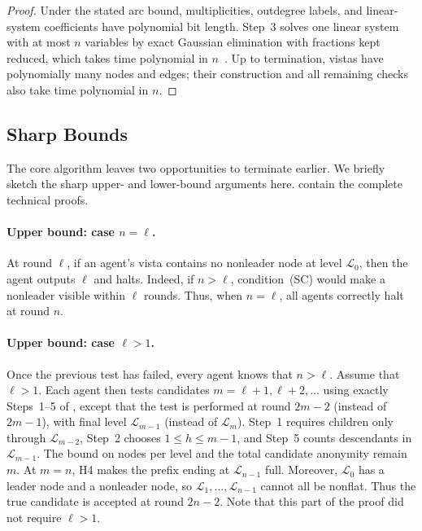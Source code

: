 \documentclass[11pt]{article}
\begin{document}
\begin{proof}
Under the stated arc bound, multiplicities, outdegree labels, and
linear-system coefficients have polynomial bit length.
Step~3 solves one linear system with at most \(n\) variables by
exact Gaussian elimination with fractions kept reduced, which takes
time polynomial in \(n\)~\cite[Theorem~4.10]{KV12}. Up to termination, vistas have polynomially many nodes and edges; their construction and all remaining checks also take time polynomial
in \(n\).
\end{proof}

\subsection{Sharp Bounds}
\label{sec:sharp-bounds}

The core algorithm leaves two opportunities to terminate earlier.  We briefly
sketch the sharp upper- and lower-bound arguments here.
 contain the complete
technical proofs.

\paragraph{Upper bound: case \(n=\ell\).}
At round \(\ell\), if an agent's vista contains no nonleader node at level
\(\mathcal L_0\), then the agent outputs \(\ell\) and halts. Indeed, if
\(n>\ell\), condition~\textup{(SC)} would make a nonleader visible within
\(\ell\) rounds. Thus, when \(n=\ell\), all agents correctly halt at round \(n\).

\paragraph{Upper bound: case \(\ell>1\).}
Once the previous test has failed,
every agent knows that \(n>\ell\). Assume that \(\ell>1\). Each agent then tests candidates
\(m=\ell+1,\ell+2,\ldots\) using exactly Steps~1--5 of
, except that the test is performed at round
\(2m-2\) (instead of \(2m-1\)), with final level
\(\mathcal L_{m-1}\) (instead of \(\mathcal L_m\)).
Step~1 requires children only through
\(\mathcal L_{m-2}\), Step~2 chooses \(1\leq h\leq m-1\), and Step~5
counts descendants in \(\mathcal L_{m-1}\). The bound on nodes per level
and the total candidate anonymity remain \(m\).
At \(m=n\), H4 makes the prefix ending at \(\mathcal L_{n-1}\)
full. Moreover,
\(\mathcal L_0\) has a leader node and a nonleader node, so
\(\mathcal L_1,\ldots,\mathcal L_{n-1}\) cannot all be nonflat.
Thus the true candidate is accepted at round $2n-2$. Note that this part of the proof did not require $\ell>1$.
\end{document}
